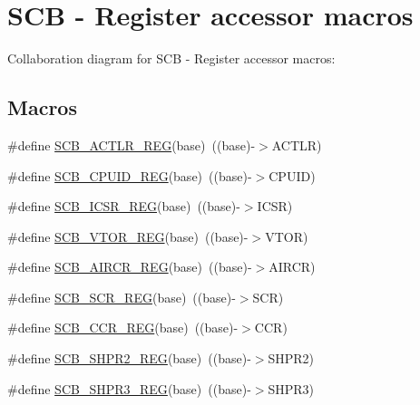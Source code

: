 \hypertarget{group___s_c_b___register___accessor___macros}{}\section{S\+CB -\/ Register accessor macros}
\label{group___s_c_b___register___accessor___macros}
Collaboration diagram for S\+CB -\/ Register accessor macros\+:
\subsection*{Macros}
\begin{DoxyCompactItemize}
\item 
\#define \hyperlink{group___s_c_b___register___accessor___macros_ga8e6ef559a6b8231b4f86185221c7f82a}{S\+C\+B\+\_\+\+A\+C\+T\+L\+R\+\_\+\+R\+EG}(base)~((base)-\/$>$A\+C\+T\+LR)
\item 
\#define \hyperlink{group___s_c_b___register___accessor___macros_ga117081636e39f490ee0d6c2dd71994c3}{S\+C\+B\+\_\+\+C\+P\+U\+I\+D\+\_\+\+R\+EG}(base)~((base)-\/$>$C\+P\+U\+ID)
\item 
\#define \hyperlink{group___s_c_b___register___accessor___macros_gad49675a96aa05153fe6157c5c12667b9}{S\+C\+B\+\_\+\+I\+C\+S\+R\+\_\+\+R\+EG}(base)~((base)-\/$>$I\+C\+SR)
\item 
\#define \hyperlink{group___s_c_b___register___accessor___macros_ga5f6385eaf8fd7164c6c3c225b6a7d3f4}{S\+C\+B\+\_\+\+V\+T\+O\+R\+\_\+\+R\+EG}(base)~((base)-\/$>$V\+T\+OR)
\item 
\#define \hyperlink{group___s_c_b___register___accessor___macros_ga128fc0df59d5e2b7fc55a6ded49b1586}{S\+C\+B\+\_\+\+A\+I\+R\+C\+R\+\_\+\+R\+EG}(base)~((base)-\/$>$A\+I\+R\+CR)
\item 
\#define \hyperlink{group___s_c_b___register___accessor___macros_gaed0c82840ade63a78c5d42790e8d9270}{S\+C\+B\+\_\+\+S\+C\+R\+\_\+\+R\+EG}(base)~((base)-\/$>$S\+CR)
\item 
\#define \hyperlink{group___s_c_b___register___accessor___macros_ga33158444a24538a7a5aaff86d3153c01}{S\+C\+B\+\_\+\+C\+C\+R\+\_\+\+R\+EG}(base)~((base)-\/$>$C\+CR)
\item 
\#define \hyperlink{group___s_c_b___register___accessor___macros_ga870a0e7eedd2b8fd1969f840dbb84f81}{S\+C\+B\+\_\+\+S\+H\+P\+R2\+\_\+\+R\+EG}(base)~((base)-\/$>$S\+H\+P\+R2)
\item 
\#define \hyperlink{group___s_c_b___register___accessor___macros_gaf6dad7136278c0fa61ad2d311352759b}{S\+C\+B\+\_\+\+S\+H\+P\+R3\+\_\+\+R\+EG}(base)~((base)-\/$>$S\+H\+P\+R3)

\end{DoxyCompactItemize}
